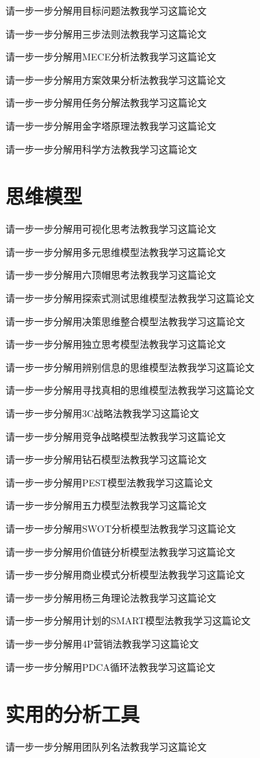 \documentclass[12pt]{book}
\begin{document}
请一步一步分解用目标问题法教我学习这篇论文

请一步一步分解用三步法则法教我学习这篇论文

请一步一步分解用MECE分析法教我学习这篇论文

请一步一步分解用方案效果分析法教我学习这篇论文

请一步一步分解用任务分解法教我学习这篇论文

请一步一步分解用金字塔原理法教我学习这篇论文

请一步一步分解用科学方法教我学习这篇论文


\section{思维模型}
请一步一步分解用可视化思考法教我学习这篇论文

请一步一步分解用多元思维模型法教我学习这篇论文

请一步一步分解用六顶帽思考法教我学习这篇论文

请一步一步分解用探索式测试思维模型法教我学习这篇论文

请一步一步分解用决策思维整合模型法教我学习这篇论文

请一步一步分解用独立思考模型法教我学习这篇论文

请一步一步分解用辨别信息的思维模型法教我学习这篇论文

请一步一步分解用寻找真相的思维模型法教我学习这篇论文

请一步一步分解用3C战略法教我学习这篇论文

请一步一步分解用竞争战略模型法教我学习这篇论文

请一步一步分解用钻石模型法教我学习这篇论文

请一步一步分解用PEST模型法教我学习这篇论文

请一步一步分解用五力模型法教我学习这篇论文

请一步一步分解用SWOT分析模型法教我学习这篇论文

请一步一步分解用价值链分析模型法教我学习这篇论文

请一步一步分解用商业模式分析模型法教我学习这篇论文

请一步一步分解用杨三角理论法教我学习这篇论文

请一步一步分解用计划的SMART模型法教我学习这篇论文

请一步一步分解用4P营销法教我学习这篇论文

请一步一步分解用PDCA循环法教我学习这篇论文

\section{实用的分析工具}
请一步一步分解用团队列名法教我学习这篇论文
\end{document}

